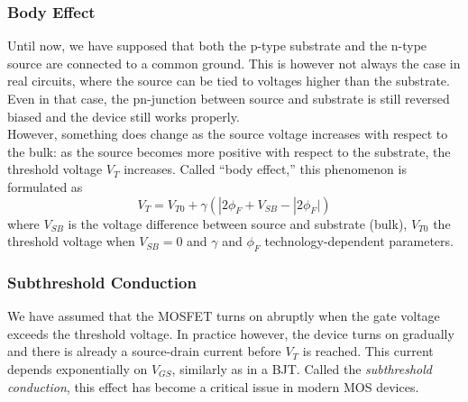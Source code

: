 \subsubsection{Body Effect}
Until now, we have supposed that both the p-type substrate and the n-type source are connected to a common ground. This is however not always the case in real circuits, where the source can be tied to voltages higher than the substrate. Even in that case, the pn-junction between source and substrate is still reversed biased and the device still works properly.\\
However, something does change as the source voltage increases with respect to the bulk: as the source becomes more positive with respect to the substrate, the threshold voltage $V_T$ increases. Called “body effect,” this phenomenon is formulated as
$$V_T = V_{T0} + \gamma (|2\phi_F + V_{SB} - |2\phi_F|)$$
where $V_{SB}$ is the voltage difference between source and  substrate (bulk), $V_{T0}$ the threshold voltage when $V_{SB} = 0$ and $\gamma$ and $\phi_F$ technology-dependent parameters.
\subsubsection{Subthreshold Conduction}
\label{sec:subthreshold_conduction}
We have assumed that the MOSFET turns on abruptly when the gate voltage exceeds the threshold voltage. In practice however, the device turns on gradually and there is already a source-drain current before $V_T$ is reached. This current depends exponentially on $V_{GS}$, similarly as in a BJT. Called the \emph{subthreshold conduction}, this effect has become a critical issue in modern MOS devices.